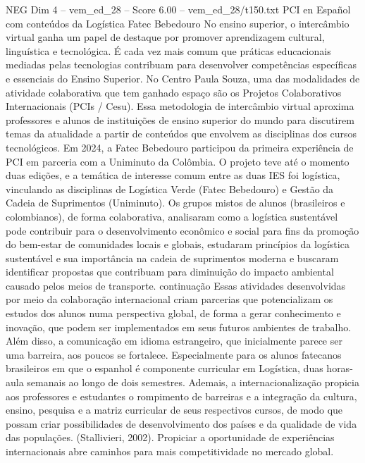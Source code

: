 \begin{textsample}{NEG Dim 4 – vem\_ed\_28 – Score 6.00 – vem\_ed\_28/t150.txt}  \label{ex:f4_neg_133}
PCI en Español com conteúdos da Logística Fatec Bebedouro No ensino superior, o intercâmbio virtual ganha um papel de destaque por promover aprendizagem cultural, linguística e tecnológica.
É cada vez mais comum que práticas educacionais mediadas pelas tecnologias contribuam para desenvolver competências específicas e essenciais do Ensino Superior.
No Centro Paula Souza, uma das modalidades de atividade colaborativa que tem ganhado espaço são os Projetos Colaborativos Internacionais (PCIs / Cesu).
Essa metodologia de intercâmbio virtual aproxima professores e alunos de instituições de ensino superior do mundo para discutirem temas da atualidade a partir de conteúdos que envolvem as disciplinas dos cursos tecnológicos.
Em 2024, a Fatec Bebedouro participou da primeira experiência de PCI em parceria com a Uniminuto da Colômbia.
O projeto teve até o momento duas edições, e a temática de interesse comum entre as duas IES foi logística, vinculando as disciplinas de Logística Verde (Fatec Bebedouro) e Gestão da Cadeia de Suprimentos (Uniminuto).
Os grupos mistos de alunos (brasileiros e colombianos), de forma colaborativa, analisaram como a logística sustentável pode contribuir para o desenvolvimento econômico e social para fins da promoção do bem-estar de comunidades locais e globais, estudaram princípios da logística sustentável e sua importância na cadeia de suprimentos moderna e buscaram identificar propostas que contribuam para diminuição do impacto ambiental causado pelos meios de transporte. continuação Essas atividades desenvolvidas por meio da colaboração internacional criam parcerias que potencializam os estudos dos alunos numa perspectiva global, de forma a gerar conhecimento e inovação, que podem ser implementados em seus futuros ambientes de trabalho.
Além disso, a comunicação em idioma estrangeiro, que inicialmente parece ser uma barreira, aos poucos se fortalece.
Especialmente para os alunos fatecanos brasileiros em que o espanhol é componente curricular em Logística, duas horas-aula semanais ao longo de dois semestres.
Ademais, a internacionalização propicia aos professores e estudantes o rompimento de barreiras e a integração da cultura, ensino, pesquisa e a matriz curricular de seus respectivos cursos, de modo que possam criar possibilidades de desenvolvimento dos países e da qualidade de vida das populações. (Stallivieri, 2002).
Propiciar a oportunidade de experiências internacionais abre caminhos para mais competitividade no mercado global.

\end{textsample}
